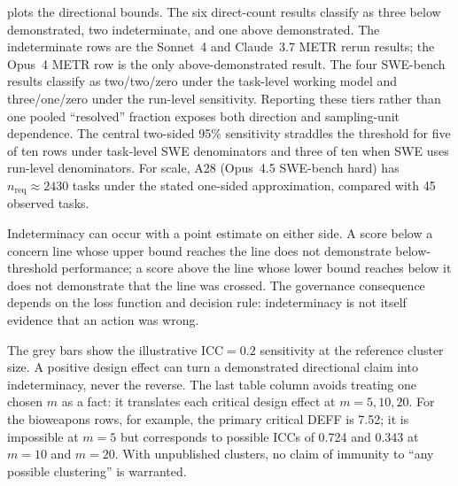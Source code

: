 \documentclass{article}
\begin{document}
 plots the directional bounds. The six direct-count results classify as
three below demonstrated, two indeterminate, and one above demonstrated. The indeterminate
rows are the Sonnet~4 and Claude~3.7 METR rerun results; the Opus~4 METR row is the only
above-demonstrated result. The four SWE-bench results classify as two/two/zero under the
task-level working model and three/one/zero under the run-level sensitivity. Reporting these
tiers rather than one pooled ``resolved'' fraction exposes both direction and sampling-unit
dependence. The central two-sided 95\% sensitivity straddles the threshold for five of ten
rows under task-level SWE denominators and three of ten when SWE uses run-level
denominators. For scale, A28 (Opus~4.5 SWE-bench hard) has
$n_{\mathrm{req}}\approx2430$ tasks under the stated one-sided approximation, compared with
45 observed tasks.



Indeterminacy can occur with a point estimate on either side. A score below a concern line
whose upper bound reaches the line does not demonstrate below-threshold performance; a score
above the line whose lower bound reaches below it does not demonstrate that the line was
crossed. The governance consequence depends on the loss function and decision rule:
indeterminacy is not itself evidence that an action was wrong.


The grey bars show the illustrative ICC$=0.2$ sensitivity at the reference cluster size.
A positive design effect can turn a demonstrated directional claim into indeterminacy,
never the reverse. The last
table column avoids treating one chosen $m$ as a fact: it translates each critical design
effect at $m=5,10,20$. For the bioweapons rows, for example, the primary critical DEFF is
7.52; it is impossible at $m=5$ but corresponds to possible ICCs of 0.724 and 0.343 at
$m=10$ and $m=20$. With unpublished clusters, no claim of immunity to ``any possible
clustering'' is warranted.
\end{document}
